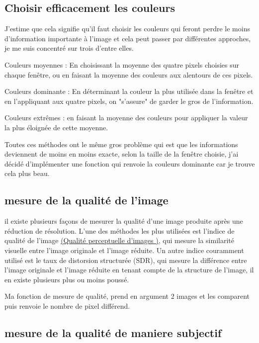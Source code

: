 \documentclass{article}
\begin{document}
\subsection{Choisir efficacement les couleurs}
J'estime que cela signifie qu'il faut choisir les couleurs qui feront perdre le moins d'information importante à l'image et cela peut passer par différentes approches, je me suis concentré sur trois d'entre elles.

Couleurs moyennes : En choisissant la moyenne des quatre pixels choisies sur chaque fenêtre, ou en faisant la moyenne des couleurs aux alentours de ces pixels.

Couleurs dominante : En déterminant la couleur la plus utilisée dans la fenêtre et en l'appliquant aux quatre pixels, on "s'assure" de garder le gros de l'information.

Couleurs extrêmes : en faisant la moyenne des couleurs pour appliquer la valeur la plus éloignée de cette moyenne.

Toutes ces méthodes ont le même gros problème qui est que les informations deviennent de moins en moins exacte, selon la taille de la fenêtre choisie, j'ai décidé d'implémenter une fonction qui renvoie la couleurs dominante car je trouve cela plus beau.

\subsection{mesure de la qualité
de l’image}
il existe plusieurs façons de mesurer la qualité d'une image produite après une réduction de résolution. L'une des méthodes les plus utilisées est l'indice de qualité de l'image \href{https://fr.wikipedia.org/wiki/Qualit%C3%A9_perceptuelle_d%27images}{(Qualité perceptuelle d'images
)}, qui mesure la similarité visuelle entre l'image originale et l'image réduite. Un autre indice couramment utilisé est le taux de distorsion structurée (SDR), qui mesure la différence entre l'image originale et l'image réduite en tenant compte de la structure de l'image, il en existe plusieurs plus ou moins poussé.

Ma fonction de mesure de qualité, prend en argument 2 images et les comparent
puis renvoie le nombre de pixel différend.


\subsection{mesure de la qualité de maniere subjectif}
\end{document}
